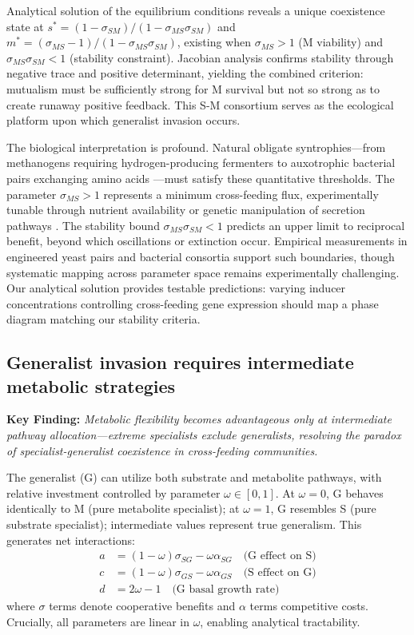 \documentclass[9pt,twocolumn]{pnas-new}
\begin{document}
Analytical solution of the equilibrium conditions reveals a unique coexistence state at $s^* = (1-\sigma_{SM})/(1-\sigma_{MS}\sigma_{SM})$ and $m^* = (\sigma_{MS}-1)/(1-\sigma_{MS}\sigma_{SM})$, existing when $\sigma_{MS} > 1$ (M viability) and $\sigma_{MS}\sigma_{SM} < 1$ (stability constraint). Jacobian analysis confirms stability through negative trace and positive determinant, yielding the combined criterion: mutualism must be sufficiently strong for M survival but not so strong as to create runaway positive feedback. This S-M consortium serves as the ecological platform upon which generalist invasion occurs.

The biological interpretation is profound. Natural obligate syntrophies—from methanogens requiring hydrogen-producing fermenters \cite{schink2002syntrophic,stams2006electron} to auxotrophic bacterial pairs exchanging amino acids \cite{d2008auxotroph,pande2015fitness}—must satisfy these quantitative thresholds. The parameter $\sigma_{MS} > 1$ represents a minimum cross-feeding flux, experimentally tunable through nutrient availability or genetic manipulation of secretion pathways \cite{mee2014syntrophic,harcombe2014metabolic}. The stability bound $\sigma_{MS}\sigma_{SM} < 1$ predicts an upper limit to reciprocal benefit, beyond which oscillations or extinction occur. Empirical measurements in engineered yeast pairs \cite{shou2007synthetic} and bacterial consortia \cite{hoek2016resource} support such boundaries, though systematic mapping across parameter space remains experimentally challenging. Our analytical solution provides testable predictions: varying inducer concentrations controlling cross-feeding gene expression should map a phase diagram matching our stability criteria.

\subsection*{Generalist invasion requires intermediate metabolic strategies}

\textbf{Key Finding:} \textit{Metabolic flexibility becomes advantageous only at intermediate pathway allocation—extreme specialists exclude generalists, resolving the paradox of specialist-generalist coexistence in cross-feeding communities.}

The generalist (G) can utilize both substrate and metabolite pathways, with relative investment controlled by parameter $\omega \in [0,1]$. At $\omega = 0$, G behaves identically to M (pure metabolite specialist); at $\omega = 1$, G resembles S (pure substrate specialist); intermediate values represent true generalism. This generates net interactions:
\begin{align}
a &= (1-\omega)\sigma_{SG} - \omega\alpha_{SG} \quad \text{(G effect on S)}\\
c &= (1-\omega)\sigma_{GS} - \omega\alpha_{GS} \quad \text{(S effect on G)}\\
d &= 2\omega - 1 \quad \text{(G basal growth rate)}
\end{align}
where $\sigma$ terms denote cooperative benefits and $\alpha$ terms competitive costs. Crucially, all parameters are linear in $\omega$, enabling analytical tractability.
\end{document}
